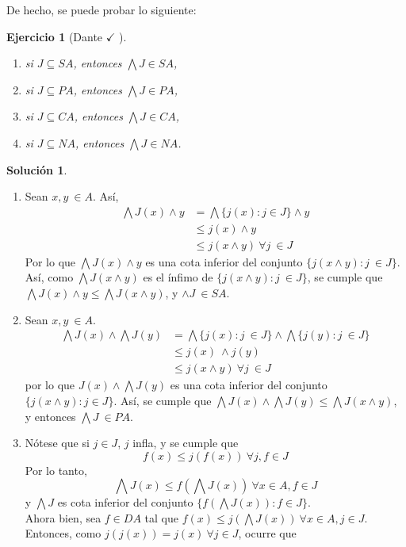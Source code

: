 \documentclass[12pt,letterpaper,titlepage]{article}
\newtheorem{exe}{Ejercicio}
\theoremstyle{definition}
\newtheorem*{sol}{Solución}
\renewcommand\inf{\wedge}
\newcommand\Inf{\bigwedge}
\newcommand\<{\langle}
\renewcommand\>{\rangle}
\begin{document}
De hecho, se puede probar lo siguiente:
\begin{exe}[Dante $\checkmark$ ]
  \begin{enumerate}
    \item si $J\subseteq SA$, entonces $\Inf J\in SA$,
    \item si $J\subseteq PA$, entonces $\Inf J\in PA$,
    \item si $J\subseteq CA$, entonces $\Inf J\in CA$,
    \item si $J\subseteq NA$, entonces $\Inf J\in NA$.
  \end{enumerate}
\end{exe}
\begin{sol}
    \begin{enumerate}
        \item Sean $x,y \ \in A$.  Así, 
        \begin{align*}
            \Inf J(x)\inf y&=\Inf\{j(x):j\in J\}\inf y\\
            &\leq j(x)\inf y\\
            &\leq j(x\inf y) \ \forall j \ \in J
        \end{align*}
        Por lo que $\Inf J(x)\inf y$ es una cota inferior del conjunto $\{j(x\inf y) : j \ \in J\}$. Así, como $\Inf J(x\inf y)$ es el ínfimo de $\{j(x\inf y) : j \ \in J\}$, se cumple que $\Inf J(x)\inf y\leq \Inf J(x\inf y)$, y $\inf J \ \in SA$.
        \item Sean $x, y \ \in A$. 
        \begin{align*}
            \Inf J(x)\inf \Inf J(y)&=\Inf\{j(x):j \ \in J\} \inf \Inf \{j(y) : j \ \in J\}\\
            &\leq j(x) \ \inf j(y) \\
            &\leq j(x\inf y) \ \forall j \ \in J
        \end{align*}
        por lo que $J(x)\inf \Inf J(y)$ es una cota inferior del conjunto $\{j(x\inf y): j \in J\}$. Así, se cumple que $\Inf J(x) \inf \Inf J(y)\leq \Inf J(x\inf y)$, y entonces $\Inf J \ \in PA$.
        \item Nótese que si $j\in J$, $j$ infla, y se cumple que 
        $$f(x)\leq j(f(x)) \ \forall j,f \in J$$
        Por lo tanto, 
        $$\Inf J(x)\leq f(\Inf J(x)) \ \forall x\in A, f\in J$$
        y $\Inf J$ es cota inferior del conjunto $\{f(\Inf J(x)):f\in J\}$.
        \\
        Ahora bien, sea $f\in DA$ tal que $f(x) \leq j(\Inf J(x)) \ \forall x\in A, j\in J$. Entonces, como $j(j(x))=j(x) \ \forall j\in J$, ocurre que 

\end{enumerate}
\end{sol}
\end{document}
